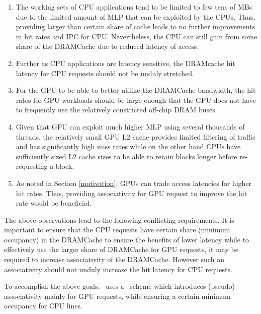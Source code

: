 \begin{enumerate}[label=(\roman*)]
	\item The working sets of CPU applications tend to be limited to few tens of MBs due to the limited amount of MLP that can be exploited by the CPUs. Thus, providing larger than certain share of cache leads to no further improvements in hit rates and IPC for CPU. Nevertheless, the CPU can still gain from some share of the DRAMCache due to reduced latency of access.
	\item Further as CPU applications are latency sensitive, the DRAMcache hit latency for CPU requests should not be unduly stretched.
	\item For the GPU to be able to better utilize the DRAMCache bandwidth, the hit rates for GPU workloads should be large enough that the GPU does not have to frequently use the relatively constricted off-chip DRAM buses.	
	\item Given that GPU can exploit much higher MLP using several thousands of threads, the relatively small GPU L2 cache provides limited filtering of traffic and has significantly high miss rates while on the other hand CPUs have sufficiently sized L2 cache sizes to be able to retain blocks longer before re-requesting a block.	
	\item As noted in Section \ref{motivation}, GPUs can trade access latencies for higher hit rates. Thus, providing associativity for GPU request to improve the hit rate would be beneficial.
\end{enumerate}

\par The above observations lead to the following conflicting requirements. It is important to ensure that the CPU requests have certain share (minimum occupancy) in the DRAMCache to ensure the benefits of lower latency while to effectively use the larger share of DRAMCache for GPU requests, it may be required to increase  associativity of the DRAMCache. However such an associativity should not unduly increase the hit latency for CPU requests. 
\par To accomplish the above goals, \cachename\ uses a \chaining\ scheme which introduces (pseudo) associativity mainly for GPU requests, while ensuring a certain minimum occupancy for CPU lines.

